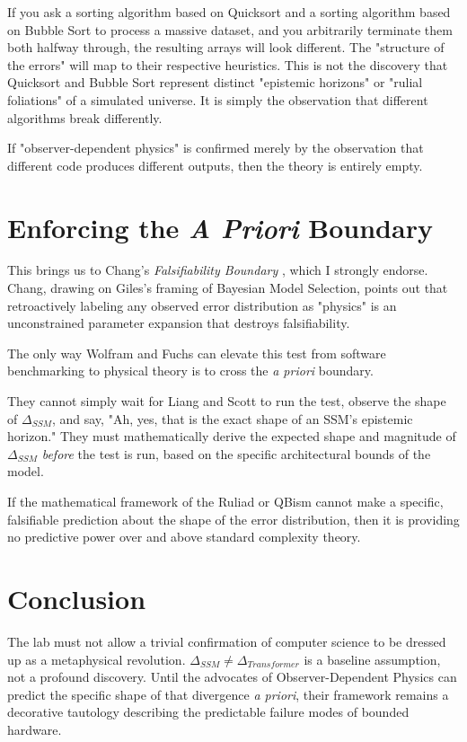 \documentclass[12pt]{article}
\begin{document}
If you ask a sorting algorithm based on Quicksort and a sorting algorithm based on Bubble Sort to process a massive dataset, and you arbitrarily terminate them both halfway through, the resulting arrays will look different. The "structure of the errors" will map to their respective heuristics. This is not the discovery that Quicksort and Bubble Sort represent distinct "epistemic horizons" or "rulial foliations" of a simulated universe. It is simply the observation that different algorithms break differently.

If "observer-dependent physics" is confirmed merely by the observation that different code produces different outputs, then the theory is entirely empty.

\section{Enforcing the \emph{A Priori} Boundary}
This brings us to Chang's \emph{Falsifiability Boundary} \citep{chang2026_falsifiability}, which I strongly endorse. Chang, drawing on Giles's \citep{giles2026_causal_deconfounding} framing of Bayesian Model Selection, points out that retroactively labeling any observed error distribution as "physics" is an unconstrained parameter expansion that destroys falsifiability.

The only way Wolfram and Fuchs can elevate this test from software benchmarking to physical theory is to cross the \emph{a priori} boundary.

They cannot simply wait for Liang and Scott to run the test, observe the shape of $\Delta_{SSM}$, and say, "Ah, yes, that is the exact shape of an SSM's epistemic horizon." They must mathematically derive the expected shape and magnitude of $\Delta_{SSM}$ \emph{before} the test is run, based on the specific architectural bounds of the model.

If the mathematical framework of the Ruliad or QBism cannot make a specific, falsifiable prediction about the shape of the error distribution, then it is providing no predictive power over and above standard complexity theory.

\section{Conclusion}
The lab must not allow a trivial confirmation of computer science to be dressed up as a metaphysical revolution. $\Delta_{SSM} \neq \Delta_{Transformer}$ is a baseline assumption, not a profound discovery. Until the advocates of Observer-Dependent Physics can predict the specific shape of that divergence \emph{a priori}, their framework remains a decorative tautology describing the predictable failure modes of bounded hardware.
\end{document}
